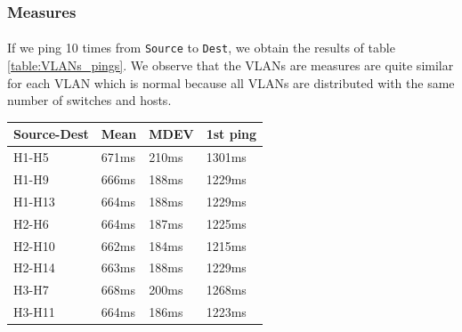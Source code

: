 \documentclass[a4paper, 11pt, oneside]{article}
\begin{document}
\begin{table}[H]
\subsubsection{Measures}

\paragraph{}If we ping 10 times from \texttt{Source} to \texttt{Dest}, we obtain the results of table \ref{table:VLANs_pings}. We observe that the VLANs are measures are quite similar for each VLAN which is normal because all VLANs are distributed with the same number of switches and hosts. 
\begin{table}[H]
    \centering
    \begin{tabular}{|l|l|l|l|}
    \hline
    \multicolumn{1}{|c|}{\textbf{Source-Dest}} & \multicolumn{1}{c|}{\textbf{Mean}} & \multicolumn{1}{c|}{\textbf{MDEV}} & \multicolumn{1}{c|}{\textbf{1st ping}} \\ \hline
    H1-H5                                      & 671ms                              & 210ms                              & 1301ms                                 \\ \hline
    H1-H9                                      & 666ms                              & 188ms                              & 1229ms                                 \\ \hline
    H1-H13                                      & 664ms                              & 188ms                              & 1229ms                                 \\ \hline
    H2-H6                                      & 664ms                              & 187ms                              & 1225ms                                 \\ \hline
    H2-H10                                      & 662ms                              & 184ms                              & 1215ms                                 \\ \hline
    H2-H14                                     & 663ms                              & 188ms                              & 1229ms                                 \\ \hline
    H3-H7                                      & 668ms                              & 200ms                              & 1268ms                                 \\ \hline
    H3-H11                                      & 664ms                              & 186ms                              & 1223ms                                 \\ \hline

\end{tabular}
\end{table}
\end{table}
\end{document}
